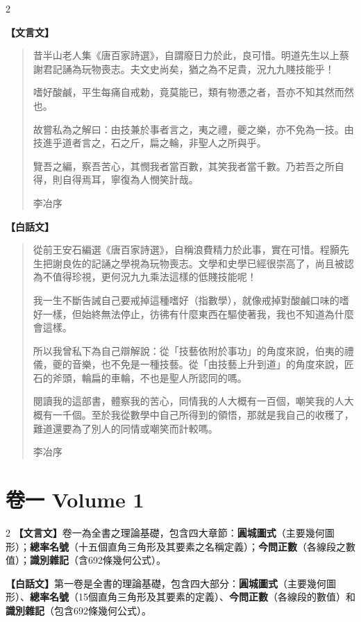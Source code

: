 \documentclass[11pt,a4paper]{article}
\begin{document}
\begin{paracol}{2}
{\color{prefacecolor}
\textbf{【文言文】}

\begin{quote}
昔半山老人集《唐百家詩選》，自謂廢日力於此，良可惜。明道先生以上蔡謝君記誦為玩物喪志。夫文史尚矣，猶之為不足貴，況九九賤技能乎！

嗜好酸鹹，平生每痛自戒勅，竟莫能已，類有物慿之者，吾亦不知其然而然也。

故嘗私為之解曰：由技兼於事者言之，夷之禮，夔之樂，亦不免為一技。由技進乎道者言之，石之斤，扁之輪，非聖人之所與乎。

覽吾之編，察吾苦心，其憫我者當百數，其笑我者當千數。乃若吾之所自得，則自得焉耳，寧復為人憫笑計哉。

\hfill 李冶序
\end{quote}
}

\switchcolumn
{\color{prefacecolor}
\textbf{【白話文】}

\begin{quote}
從前王安石編選《唐百家詩選》，自稱浪費精力於此事，實在可惜。程顥先生把謝良佐的記誦之學視為玩物喪志。文學和史學已經很崇高了，尚且被認為不值得珍視，更何況九九乘法這樣的低賤技能呢！

我一生不斷告誡自己要戒掉這種嗜好（指數學），就像戒掉對酸鹹口味的嗜好一樣，但始終無法停止，彷彿有什麼東西在驅使著我，我也不知道為什麼會這樣。

所以我曾私下為自己辯解說：從「技藝依附於事功」的角度來說，伯夷的禮儀，夔的音樂，也不免是一種技藝。從「由技藝上升到道」的角度來說，匠石的斧頭，輪扁的車輪，不也是聖人所認同的嗎。

閱讀我的這部書，體察我的苦心，同情我的人大概有一百個，嘲笑我的人大概有一千個。至於我從數學中自己所得到的領悟，那就是我自己的收穫了，難道還要為了別人的同情或嘲笑而計較嗎。

\hfill 李冶序
\end{quote}
}
\end{paracol}

\newpage

\section{卷一 \quad Volume 1}
\label{sec:vol1}

\begin{paracol}{2}
\textbf{【文言文】}卷一為全書之理論基礎，包含四大章節：\textbf{圓城圖式}（主要幾何圖形）；\textbf{總率名號}（十五個直角三角形及其要素之名稱定義）；\textbf{今問正數}（各線段之數值）；\textbf{識別雜記}（含692條幾何公式）。

\switchcolumn
\textbf{【白話文】}第一卷是全書的理論基礎，包含四大部分：\textbf{圓城圖式}（主要幾何圖形）、\textbf{總率名號}（15個直角三角形及其要素的定義）、\textbf{今問正數}（各線段的數值）和\textbf{識別雜記}（包含692條幾何公式）。
\end{paracol}
\end{document}
